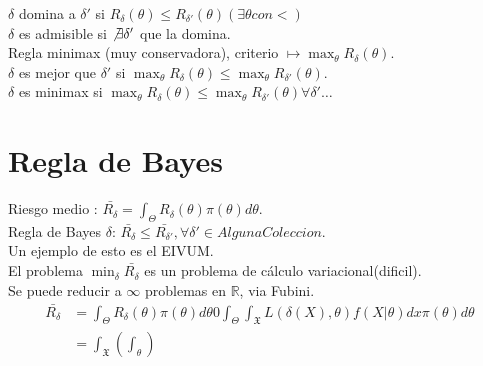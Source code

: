 \documentclass[10pt]{article}
\theoremstyle{plain}
\theoremstyle{definition}
\begin{document}
$\delta$ domina a $\delta'$ si $R_{\delta}(\theta) \le R_{\delta'}(\theta) (\exists \theta con <)$\\

$\delta$ es admisible si $\not \exists \delta'$ que la domina.\\

Regla minimax (muy conservadora), criterio $\mapsto \max_{\theta}R_{\delta}(\theta)$.\\

$\delta$ es mejor que $\delta'$ si $\max_{\theta}R_{\delta}(\theta) \le \max_{\theta}R_{\delta'}(\theta)$.\\

$\delta$ es minimax si $\max_{\theta}R_{\delta}(\theta) \le \max_{\theta}R_{\delta'}(\theta) \forall \delta' \ldots$

\section{Regla de Bayes}
 Riesgo medio : $\bar{R_{\delta}} = \int_{\Theta}R_{\delta}(\theta)\pi(\theta)d\theta$.\\
 
 Regla de Bayes $\delta$: $\bar{R_{\delta}} \le \bar{R_{\delta'}}, \forall \delta' \in AlgunaColeccion$.\\
 
 Un ejemplo de esto es el EIVUM.\\
 
 El problema $\min_{\delta}\bar{R_{\delta}}$ es un problema de cálculo variacional(dificil).\\
 
 Se puede reducir a $\infty$ problemas en $\mathbb{R}$, via Fubini.\\
 
 \begin{align*}
 \bar{R_{\delta}} &= \int_{\Theta}R_{\delta}(\theta)\pi(\theta)d\theta 0 \int_{\Theta}\int_{\mathfrak{X}} L(\delta(X),\theta) f(X|\theta)dx \pi(\theta)d\theta\\
 &= \int_{\mathfrak{X}}\left(\int_{\theta}\right)
 \end{align*}
\end{document}

